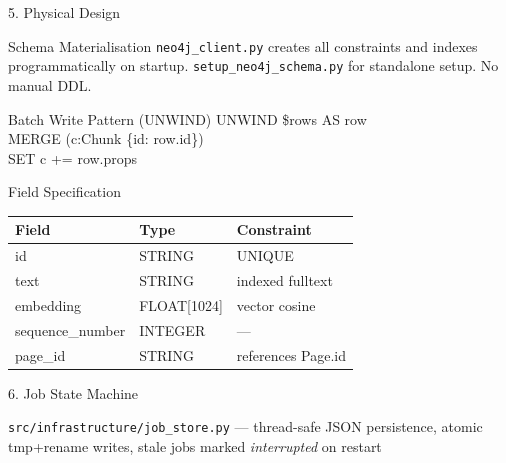 \documentclass[aspectratio=169]{beamer}
\begin{document}
\begin{frame}[shrink=5]{5. Physical Design}
\begin{block}{Schema Materialisation}
{\small \texttt{neo4j\_client.py} creates all constraints and indexes programmatically on
startup. \texttt{setup\_neo4j\_schema.py} for standalone setup. No manual DDL.}
\end{block}

\begin{exampleblock}{Batch Write Pattern (UNWIND)}
{\ttfamily\small
UNWIND \$rows AS row\\
MERGE (c:Chunk \{id: row.id\})\\
SET c += row.props}
\end{exampleblock}

\begin{alertblock}{Field Specification}
\begin{tabular}{@{}lll@{}}
\toprule
\textbf{Field} & \textbf{Type} & \textbf{Constraint} \\
\midrule
id               & STRING      & UNIQUE \\
text             & STRING      & indexed fulltext \\
embedding        & FLOAT[1024] & vector cosine \\
sequence\_number & INTEGER     & --- \\
page\_id         & STRING      & references Page.id \\
\bottomrule
\end{tabular}
\end{alertblock}
\end{frame}

\begin{frame}{6. Job State Machine}
\begin{center}
\end{center}
{\scriptsize \texttt{src/infrastructure/job\_store.py} --- thread-safe JSON persistence,
atomic tmp+rename writes, stale jobs marked \textit{interrupted} on restart}
\end{frame}
\end{document}
